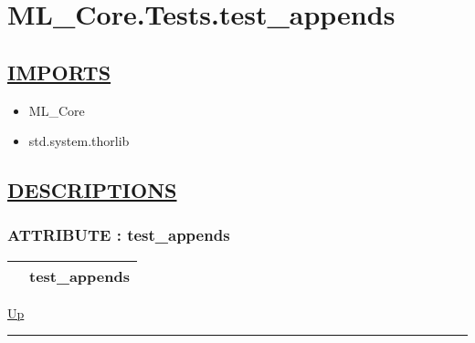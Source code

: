 \chapter*{ML\_Core.Tests.test\_appends}
\hypertarget{ecldoc:toc:ML_Core.Tests.test_appends}{}

\section*{\underline{IMPORTS}}
\begin{itemize}
\item ML\_Core
\item std.system.thorlib
\end{itemize}

\section*{\underline{DESCRIPTIONS}}
\subsection*{ATTRIBUTE : test\_appends}
\hypertarget{ecldoc:ml_core.tests.test_appends}{}

{\renewcommand{\arraystretch}{1.5}
\begin{tabularx}{\textwidth}{|>{\raggedright\arraybackslash}l|X|}
\hline
\hspace{0pt} & test\_appends \\
\hline
\end{tabularx}
}

\hyperlink{ecldoc:toc:ML_Core/Tests}{Up}

\par


\rule{\textwidth}{0.4pt}
